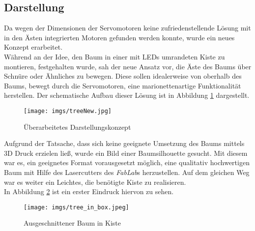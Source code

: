 \documentclass[.../Dokumentation.tex]{subfiles}
\begin{document}
\subsection{Darstellung}\label{sec-ita3-visualization}
Da wegen der Dimensionen der Servomotoren keine zufriedenstellende Lösung 
mit in den Ästen integrierten Motoren gefunden werden konnte, wurde ein neues 
Konzept erarbeitet.\\
Während an der Idee, den Baum in einer mit LEDs umrandeten Kiste zu montieren, 
festgehalten wurde, sah der neue Ansatz vor, die Äste des Baums über Schnüre 
oder Ähnliches zu bewegen.
Diese sollen idealerweise von oberhalb des Baums, bewegt durch die Servomotoren, 
eine marionettenartige Funktionalität herstellen.
Der schematische Aufbau dieser Lösung ist in Abbildung \ref{fig-treeNew} 
dargestellt.
\begin{figure}[H]
\begin{center}
    \texttt{[image: imgs/treeNew.jpg]}
    \caption{Überarbeitetes Darstellungskonzept}
    \label{fig-treeNew}
\end{center}
\end{figure}
\noindent
Aufgrund der Tatsache, dass sich keine geeignete Umsetzung des Baums  
mittels 3D Druck erzielen ließ, wurde ein Bild einer Baumsilhouette gesucht.
Mit diesem war es, ein geeignetes Format vorausgesetzt möglich, eine qualitativ 
hochwertigen Baum mit Hilfe des Lasercutters des \textit{FabLab}s herzustellen.
Auf dem gleichen Weg war es weiter ein Leichtes, die benötigte Kiste zu 
realisieren.\\
In Abbildung \ref{fig-tree-in-box} ist ein erster Eindruck hiervon zu sehen.
\begin{figure}[H]
\begin{center}
    \texttt{[image: imgs/tree\_in\_box.jpeg]}
    \caption{Ausgeschnittener Baum in Kiste}
    \label{fig-tree-in-box}
\end{center}
\end{figure}
\end{document}
